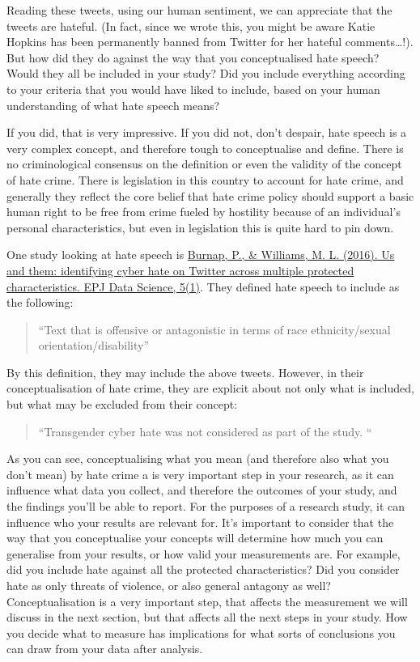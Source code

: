 \documentclass[
]{book}
\begin{document}
Reading these tweets, using our human sentiment, we can appreciate that the tweets are hateful. (In fact, since we wrote this, you might be aware Katie Hopkins has been permanently banned from Twitter for her hateful comments\ldots!). But how did they do against the way that you conceptualised hate speech? Would they all be included in your study? Did you include everything according to your criteria that you would have liked to include, based on your human understanding of what hate speech means?

If you did, that is very impressive. If you did not, don't despair, hate speech is a very complex concept, and therefore tough to conceptualise and define. There is no criminological consensus on the definition or even the validity of the concept of hate crime. There is legislation in this country to account for hate crime, and generally they reflect the core belief that hate crime policy should support a basic human right to be free from crime fueled by hostility because of an individual's personal characteristics, but even in legislation this is quite hard to pin down.

One study looking at hate speech is \href{https://epjdatascience.springeropen.com/articles/10.1140/epjds/s13688-016-0072-6}{Burnap, P., \& Williams, M. L. (2016). Us and them: identifying cyber hate on Twitter across multiple protected characteristics. EPJ Data Science, 5(1)}. They defined hate speech to include as the following:

\begin{quote}
``Text that is offensive or antagonistic in terms of race ethnicity/sexual orientation/disability''
\end{quote}

By this definition, they may include the above tweets. However, in their conceptualisation of hate crime, they are explicit about not only what is included, but what may be excluded from their concept:

\begin{quote}
``Transgender cyber hate was not considered as part of the study. ``
\end{quote}

As you can see, conceptualising what you mean (and therefore also what you don't mean) by hate crime a is very important step in your research, as it can influence what data you collect, and therefore the outcomes of your study, and the findings you'll be able to report. For the purposes of a research study, it can influence who your results are relevant for. It's important to consider that the way that you conceptualise your concepts will determine how much you can generalise from your results, or how valid your measurements are. For example, did you include hate against all the protected characteristics? Did you consider hate as only threats of violence, or also general antagony as well? Conceptualisation is a very important step, that affects the measurement we will discuss in the next section, but that affects all the next steps in your study. How you decide what to measure has implications for what sorts of conclusions you can draw from your data after analysis.
\end{document}
